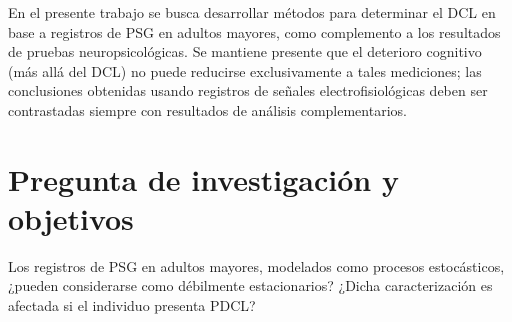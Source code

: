 \documentclass[12pt,letterpaper]{book}
\begin{document}

%






En el presente trabajo se busca desarrollar métodos para determinar el DCL en base a registros de PSG en adultos mayores, como complemento a los resultados de pruebas neuropsicológicas.
%
Se mantiene presente que el deterioro cognitivo (más allá del DCL) no puede reducirse exclusivamente a tales mediciones; las conclusiones obtenidas usando registros de señales electrofisiológicas deben ser contrastadas siempre con resultados de análisis complementarios.


\section*{Pregunta de investigación y objetivos}

Los registros de PSG en adultos mayores, modelados como procesos estocásticos, ¿pueden considerarse como débilmente estacionarios?
%
¿Dicha caracterización es afectada si el individuo presenta PDCL?

\end{document}
